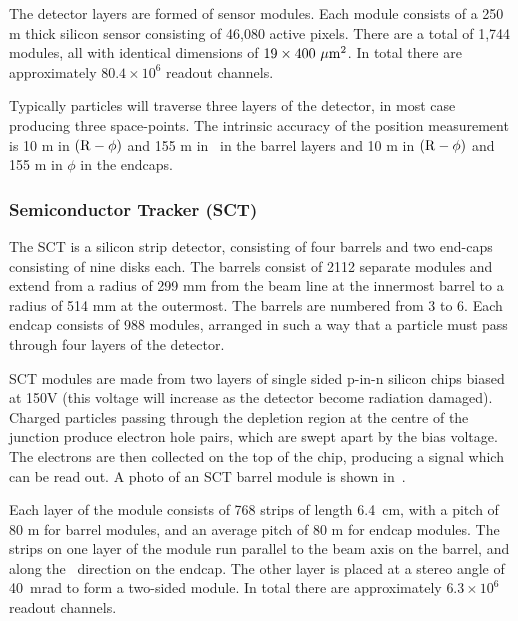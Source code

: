 The detector layers are formed of sensor modules. Each module consists of a 250 \micro m thick
silicon sensor consisting of 46,080 active pixels. There are a total of 1,744
modules, all with identical dimensions of $19\times400~\mu \rm{m}^{2}$. In total
there are approximately $80.4\times 10^{6}$ readout channels.

Typically particles will traverse three layers of the detector, in most case
producing three space-points. The intrinsic accuracy of the position
measurement is 10 \micro m in $(\rm{R}-\phi)$ and 155 \micro m in \z\ in the
barrel layers and 10 \micro m in $(\rm{R}-\phi)$ and 155 \micro m in $\phi$ in
the endcaps.

\subsubsection{Semiconductor Tracker (SCT)}

\label{sec:Detector-SCT}

The SCT is a silicon strip detector, consisting of four barrels and two end-caps
consisting of nine disks each. The barrels consist of 2112 separate modules and
extend from a radius of 299 mm from the beam line at the innermost barrel to a
radius of 514 mm at the outermost. The barrels are numbered from 3 to 6. Each
endcap consists of 988 modules, arranged in such a way that a particle must pass
through four layers of the detector.

SCT modules are made from two layers of single sided p-in-n silicon chips biased
at 150V (this voltage will increase as the detector become radiation damaged). 
Charged particles passing through the depletion region at the centre of
the junction produce electron hole pairs, which are swept apart by the bias
voltage. The electrons are then collected on the top of the chip, producing a
signal which can be read out. A photo of an SCT barrel module is shown
in~.

Each layer of the module consists of 768 strips of length 6.4~cm,
with a pitch of 80 \micro m for barrel modules, and an average pitch of 80
\micro m for endcap modules. The strips on one layer
of the module run parallel to the
beam axis on the barrel, and along the \R\ direction on the endcap. The other
layer is placed at a stereo angle of 40~mrad to form a two-sided module. 
In total
there are approximately $6.3 \times 10^{6}$ readout channels.

